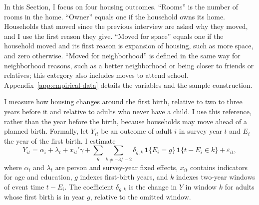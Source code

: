 In this Section, I focus on four housing outcomes. ``Rooms'' is the number
of rooms in the home. ``Owner'' equals one if the household owns its home.
Households that moved since the previous interview are asked why they moved,
and I use the first reason they give. ``Moved for space'' equals one if the
household moved and its first reason is expansion of housing, such as more
space, and zero otherwise. ``Moved for neighborhood'' is defined in the same
way for neighborhood reasons, such as a better neighborhood or being closer to friends or
relatives; this category also includes moves to attend school.
Appendix~\ref{app:empirical-data} details the variables and the sample
construction.

I measure how housing changes around the first birth, relative to two to
three years before it and relative to adults who never have a child. I use
this reference, rather than the year before the birth, because households
may move ahead of a planned birth. Formally, let $Y_{it}$ be an outcome of
adult $i$ in survey year $t$ and $E_i$ the year of the first birth. I
estimate
\begin{equation}
Y_{it}=\alpha_i+\lambda_t+x_{it}'\gamma+\sum_{g}\sum_{k\neq -3/-2}\delta_{g,k}\,\mathbf 1\{E_i=g\}\,\mathbf 1\{t-E_i\in k\}+\varepsilon_{it},
\label{eq:event-study}
\end{equation}
where $\alpha_i$ and $\lambda_t$ are person and survey-year fixed effects,
$x_{it}$ contains indicators for age and education, $g$ indexes first-birth
years, and $k$ indexes two-year windows of event time $t-E_i$. The
coefficient $\delta_{g,k}$ is the change in $Y$ in window $k$ for adults
whose first birth is in year $g$, relative to the omitted window.


